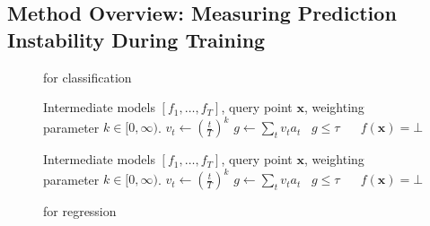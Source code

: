 \subsection{Method Overview: Measuring Prediction Instability During Training}
\label{sec:method_overview}

\begin{figure}
\begingroup
    \begin{minipage}{0.48\textwidth}

    \begin{algorithm}[H]
    	\caption{\sptd for classification}\label{alg:sptd_class}
    	\begin{algorithmic}[1]
    	\Require Intermediate models $[f_1,\ldots,f_T]$, query point $\bm{x}$, weighting parameter $k \in [0,\infty)$.
            \State {}
            \State $v_t \gets (\frac{t}{T})^k$
        \EndFor
    \State $g \gets \sum_{t} v_t a_t$
    \State \algorithmicif\ $g \leq \tau$ \algorithmicthen\  \algorithmicelse\ $f(\bm{x}) = \bot$
    	\end{algorithmic}
    \end{algorithm}
    
    \end{minipage}
    \hfill
    \begin{minipage}{0.48\textwidth}

    \begin{algorithm}[H]
    	\caption{\sptd for regression}\label{alg:sptd_regr}
    	\begin{algorithmic}[1]
    	\Require Intermediate models $[f_1,\ldots,f_T]$, query point $\bm{x}$, weighting parameter $k \in [0,\infty)$. 
            \State {}
            \State $v_t \gets (\frac{t}{T})^k$
        \EndFor
    \State $g \gets \sum_{t} v_t a_t$
    \State \algorithmicif\ $g \leq \tau$ \algorithmicthen\  \algorithmicelse\ $f(\bm{x}) = \bot$
    	\end{algorithmic}
    \end{algorithm}
    
    \end{minipage}

    \vspace{-10pt}
\endgroup
\end{figure}

